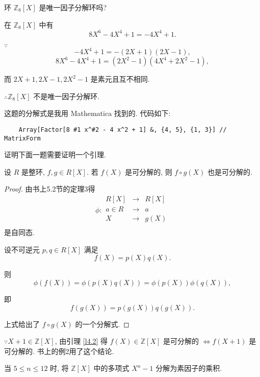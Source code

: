 \documentclass[UTF8]{ctexart}
\begin{document}
\begin{exercise}[3.3]
    环 $\mathbb{Z}_8[X]$ 是唯一因子分解环吗?
\end{exercise}
\begin{solution}
    在 $\mathbb{Z}_8[X]$ 中有
    \[8X^6-4X^4+1=-4X^4+1.\]

    $\because$
    \[-4X^4+1=-(2X+1)(2X-1),\]
    \[8X^6-4X^4+1=(2X^2-1)(4X^4+2X^2-1),\]

    而 $2X+1,2X-1,2X^2-1$ 是素元且互不相同.

    $\therefore\mathbb{Z}_8[X]$ 不是唯一因子分解环.
\end{solution}
\begin{note}
    这题的分解式是我用 Mathematica 找到的. 代码如下:
    \begin{verbatim}
    Array[Factor[8 #1 x^#2 - 4 x^2 + 1] &, {4, 5}, {1, 3}] // MatrixForm
    \end{verbatim}
\end{note}
证明下面一题需要证明一个引理.
\begin{lemma}\label{l4.2}
    设 $R$ 是整环, $f,g\in R[X]$. 若 $f(X)$ 是可分解的, 则 $f\circ g(X)$ 也是可分解的.
\end{lemma}
\begin{proof}
    由书上5.2节的定理3得
    \[\phi:\begin{array}{rcl}
        R[X] & \to & R[X] \\
        a\in R & \to & a \\
        X & \to & g(X) \\
    \end{array}\]
    是自同态.

    设不可逆元 $p,q\in R[X]$ 满足
    \[f(X)=p(X)q(X).\]

    则
    \[\phi(f(X))=\phi(p(X)q(X))=\phi(p(X))\phi(q(X)),\]

    即
    \[f(g(X))=p(g(X))q(g(X)).\]

    上式给出了 $f\circ g(X)$ 的一个分解式.
\end{proof}
\begin{note}
    $\because X+1\in\mathbb{Z}[X]$, 由引理 \ref{l4.2} 得 $f(X)\in\mathbb{Z}[X]$ 是可分解的 $\Leftrightarrow f(X+1)$ 是可分解的. 书上的例2用了这个结论.
\end{note}
\begin{exercise}[3.4]
    当 $5\leq n\leq 12$ 时, 将 $\mathbb{Z}[X]$ 中的多项式 $X^n-1$ 分解为素因子的乘积.
\end{exercise}
\end{document}
